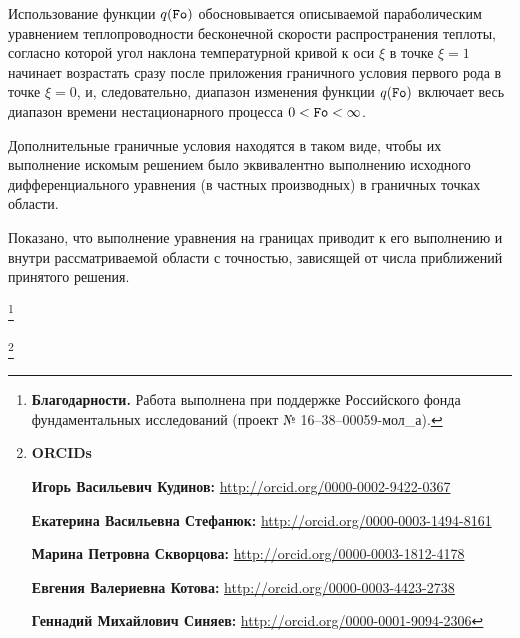Использование функции $q(\mbox{\tt Fo})$ обосновывается описываемой параболическим уравнением теплопроводности бесконечной скорости распространения теплоты, согласно которой угол наклона температурной кривой к оси $\xi$ в точке $\xi=1$ начинает возрастать сразу после приложения граничного условия первого рода в точке $\xi=0$, и, следовательно, диапазон изменения функции $q(\mbox{\tt Fo})$ включает весь диапазон времени нестационарного процесса $0<\mbox{\tt Fo}<\infty$.



Дополнительные граничные условия находятся в таком виде, чтобы их выполнение искомым решением было эквивалентно выполнению исходного дифференциального уравнения (в частных производных) в граничных точках области.

Показано, что выполнение уравнения на границах приводит к его выполнению и внутри рассматриваемой области с точностью, зависящей от числа приближений принятого решения.









\thanks{{\bf Благодарности.} Работа выполнена при поддержке Российского фонда фундаментальных исследований (проект № 16--38--00059-мол\_а).}





\thanks{{\bf ORCIDs}





{\bf Игорь Васильевич Кудинов:} \url{http://orcid.org/0000-0002-9422-0367}



{\bf Екатерина Васильевна Стефанюк:} \url{http://orcid.org/0000-0003-1494-8161}



{\bf Марина Петровна Скворцова:} \url{http://orcid.org/0000-0003-1812-4178}



{\bf Евгения Валериевна Котова:} \url{http://orcid.org/0000-0003-4423-2738}



{\bf  Геннадий Михайлович Синяев:} \url{http://orcid.org/0000-0001-9094-2306}



}






\RusRef



